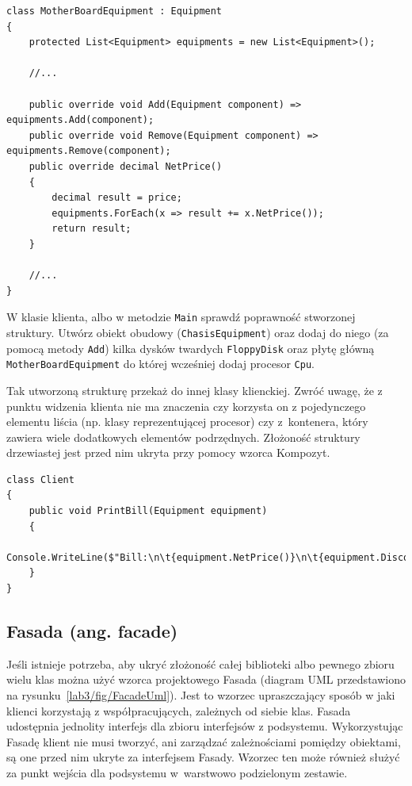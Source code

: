 \begin{lstlisting}[caption={Fragment klasy \texttt{MotherBoardEquipment}}, label={lab3/lst/compositeEquipmentClass}]
class MotherBoardEquipment : Equipment
{
	protected List<Equipment> equipments = new List<Equipment>();

	//...
		
	public override void Add(Equipment component) => equipments.Add(component);	
	public override void Remove(Equipment component) => equipments.Remove(component);
	public override decimal NetPrice()
	{
		decimal result = price;
		equipments.ForEach(x => result += x.NetPrice());	
		return result;
	}
		
	//...
}
\end{lstlisting}

W klasie klienta, albo w metodzie \texttt{Main} sprawdź poprawność stworzonej struktury. Utwórz obiekt obudowy (\texttt{ChasisEquipment}) oraz dodaj do niego (za pomocą metody \texttt{Add}) kilka dysków twardych \texttt{FloppyDisk} oraz płytę główną \texttt{MotherBoardEquipment} do której wcześniej dodaj procesor \texttt{Cpu}.

Tak utworzoną strukturę przekaż do innej klasy klienckiej. Zwróć uwagę, że z punktu widzenia klienta nie ma znaczenia czy korzysta on z pojedynczego elementu liścia (np. klasy reprezentującej procesor) czy z~kontenera, który zawiera wiele dodatkowych elementów podrzędnych. Złożoność struktury drzewiastej jest przed nim ukryta przy pomocy wzorca Kompozyt.
\begin{lstlisting}
class Client
{
	public void PrintBill(Equipment equipment)
	{
		Console.WriteLine($"Bill:\n\t{equipment.NetPrice()}\n\t{equipment.DiscountPrice()}\n\t{equipment.Power()}");
	}
}
\end{lstlisting}

\subsection{Fasada (ang. facade)}\label{lab3/sec/FacadeUml}
Jeśli istnieje potrzeba, aby ukryć złożoność całej biblioteki albo pewnego zbioru wielu klas można użyć wzorca projektowego Fasada (diagram UML przedstawiono na rysunku~\ref{lab3/fig/FacadeUml}). Jest to wzorzec upraszczający sposób w jaki klienci korzystają z współpracujących, zależnych od siebie klas. Fasada udostępnia jednolity interfejs dla zbioru interfejsów z podsystemu. Wykorzystując Fasadę klient nie musi tworzyć, ani zarządzać zależnościami pomiędzy obiektami, są one przed nim ukryte za interfejsem Fasady. Wzorzec ten może również służyć za punkt wejścia dla podsystemu w~warstwowo podzielonym zestawie.

